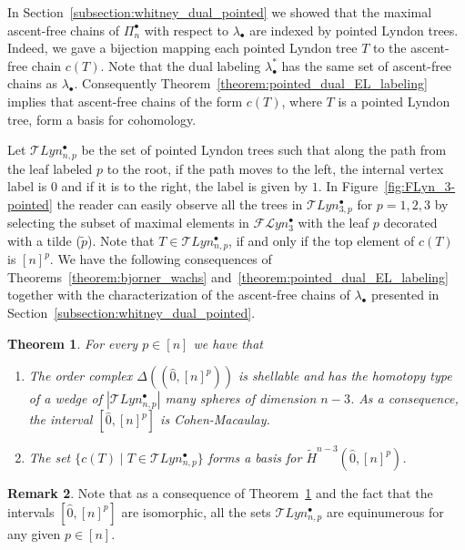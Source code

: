 \documentclass[11pt]{article}
\newtheorem{theo}{Theorem}[section]
\theoremstyle{definition}
\newtheorem{rema}[theo]{Remark}
\numberwithin{equation}{section}
\newcommand{\Flyn}{\mathcal{FL}yn}
\begin{document}
     
     In Section~\ref{subsection:whitney_dual_pointed} we showed that the maximal ascent-free chains of   $\Pi_n^\bullet$ with respect to $\lambda_{\bullet}$ are indexed by pointed Lyndon trees. Indeed, we gave a bijection mapping each pointed Lyndon tree $T$ to the ascent-free chain $c(T)$. Note that the dual labeling $\lambda^*_{\bullet}$ has the same set of ascent-free chains as $\lambda_{\bullet}$. Consequently Theorem~\ref{theorem:pointed_dual_EL_labeling} implies that ascent-free chains of the form $c(T)$, where $T$ is a pointed Lyndon tree, form a basis for cohomology.
     
     

     
     Let  $\mathcal{T}Lyn_{n,p}^{\bullet}$ be the set of pointed Lyndon trees such that along the path from the leaf labeled $p$ to the root, if the path moves to the left, the internal vertex label is $0$ and if it is to the right, the label is given by $1$. In Figure~\ref{fig:FLyn_3-pointed} the reader can easily observe all the trees in $\mathcal{T}Lyn_{3,p}^{\bullet}$ for  $p=1,2,3$ by selecting the subset of maximal elements in $\Flyn_3^{\bullet}$ with the leaf $p$ decorated with a tilde ($\tilde{p}$). Note that $T\in  \mathcal{T}Lyn_{n,p}^{\bullet}$, if and only if the top element of $c(T)$ is $[n]^p$. We have the following consequences of Theorems~\ref{theorem:bjorner_wachs} and~\ref{theorem:pointed_dual_EL_labeling} together with the characterization of the ascent-free chains of $\lambda_{\bullet}$ presented in Section~\ref{subsection:whitney_dual_pointed}.
     


\begin{theo}\label{theorem:consequence_first_pointed_labeling} 
  For every $p\in [n]$ we have that
 \begin{enumerate}
   \item   The order complex $\Delta((\hat{0},[n]^p))$ is shellable and has the homotopy type of a wedge of $| \mathcal{T}Lyn_{n,p}^{\bullet}|$ many spheres of dimension $n-3$. As a consequence, the interval $[\hat{0},[n]^p]$ is Cohen-Macaulay.

\item The set
$ \{c(T) \mid T\in \mathcal{T}Lyn_{n,p}^{\bullet}\}$ forms a basis for $\widetilde H^{n-3}(\hat{0},[n]^p)$.
 \end{enumerate}
\end{theo}

\begin{rema}
    Note that as a consequence of Theorem~\ref{theorem:consequence_first_pointed_labeling} and the fact that the intervals $[\hat{0},[n]^p]$ are  isomorphic,   all the sets  $\mathcal{T}Lyn_{n,p}^{\bullet}$ are  equinumerous for any given $p\in [n]$.
\end{rema}
\end{document}
